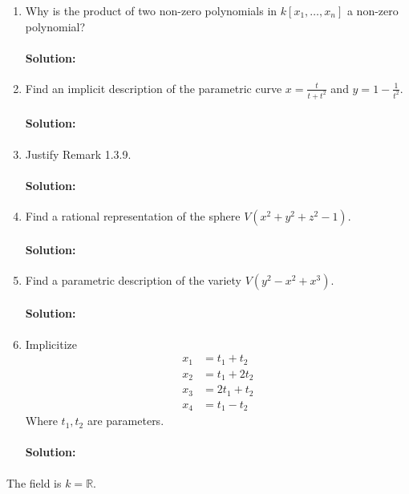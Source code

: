 \clearpage

\begin{exercise}[title = Exercise 1.3.10]
  \begin{enumerate}
    \item Why is the product of two non-zero polynomials in $k[x_1, \dots, x_n]$ a non-zero polynomial? 
    \paragraph{Solution:} 
    \item Find an implicit description of the parametric curve $x = \frac{t}{t+t^2}$ and $y = 1 - \frac{1}{t^2}$. 
    \paragraph{Solution:} 
    \item Justify Remark 1.3.9. 
    \paragraph{Solution:} 
    \item Find a rational representation of the sphere $V(x^2 + y^2 + z^2 - 1)$. 
    \paragraph{Solution:} 
    \item Find a parametric description of the variety $V(y^2 - x^2 + x^3)$. 
    \paragraph{Solution:} 
    \item Implicitize 
    \begin{align*}
      x_1 & = t_1 + t_2 \\
      x_2 & = t_1 + 2t_2 \\ 
      x_3 & = 2 t_1 + t_2 \\ 
      x_4 & = t_1 - t_2
    \end{align*} 
    Where $t_1, t_2$ are parameters.
    \paragraph{Solution:} 
   \end{enumerate}
   The field is $k = \mathbb{R}$. 
\end{exercise} 

